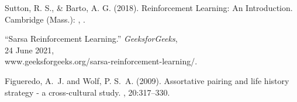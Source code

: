\documentclass[twoside,twocolumn]{article}
\begin{document}
\pagebreak



\begin{thebibliography}{99} %
Sutton, R. S., \& Barto, A. G. (2018).
\newblock Reinforcement Learning: An Introduction. Cambridge (Mass.): 
, .

“Sarsa Reinforcement Learning.” {\em GeeksforGeeks}, \\
24 June 2021,\\
\newblock www.geeksforgeeks.org/sarsa-reinforcement-learning/. 


Figueredo, A.~J. and Wolf, P. S.~A. (2009).
\newblock Assortative pairing and life history strategy - a cross-cultural
  study.
, 20:317--330.
\end{thebibliography}

\end{document}
